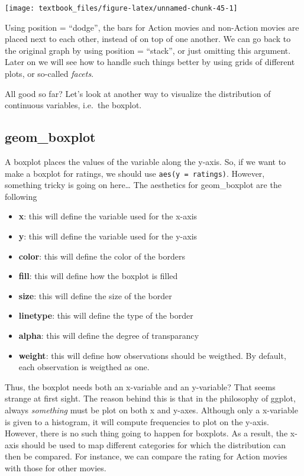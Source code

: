 \documentclass[]{tufte-book}
\providecommand{\tightlist}{%
  \setlength{\itemsep}{0pt}\setlength{\parskip}{0pt}}
\begin{document}
\texttt{[image: textbook\_files/figure-latex/unnamed-chunk-45-1]}

Using position = ``dodge'', the bars for Action movies and non-Action movies are placed next to each other, instead of on top of one another. We can go back to the original graph by using position = ``stack'', or just omitting this argument. Later on we will see how to handle such things better by using grids of different plots, or so-called \emph{facets}.

All good so far? Let's look at another way to visualize the distribution of continuous variables, i.e.~the boxplot.

\hypertarget{geom_boxplot}{%
\subsection{geom\_boxplot}\label{geom_boxplot}}

A boxplot places the values of the variable along the y-axis. So, if we want to make a boxplot for ratings, we should use \texttt{aes(y\ =\ ratings)}. However, something tricky is going on here\ldots{} The aesthetics for geom\_boxplot are the following

\begin{itemize}
\tightlist
\item
  \textbf{x}: this will define the variable used for the x-axis
\item
  \textbf{y}: this will define the variable used for the y-axis
\item
  \textbf{color}: this will define the color of the borders
\item
  \textbf{fill}: this will define how the boxplot is filled
\item
  \textbf{size}: this will define the size of the border
\item
  \textbf{linetype}: this will define the type of the border
\item
  \textbf{alpha}: this will define the degree of transparancy
\item
  \textbf{weight}: this will define how observations should be weigthed. By default, each observation is weigthed as one.
\end{itemize}

Thus, the boxplot needs both an x-variable and an y-variable? That seems strange at first sight. The reason behind this is that in the philosophy of ggplot, always \emph{something} must be plot on both x and y-axes. Although only a x-variable is given to a histogram, it will compute frequencies to plot on the y-axis. However, there is no such thing going to happen for boxplots. As a result, the x-axis should be used to map different categories for which the distribution can then be compared. For instance, we can compare the rating for Action movies with those for other movies.
\end{document}
